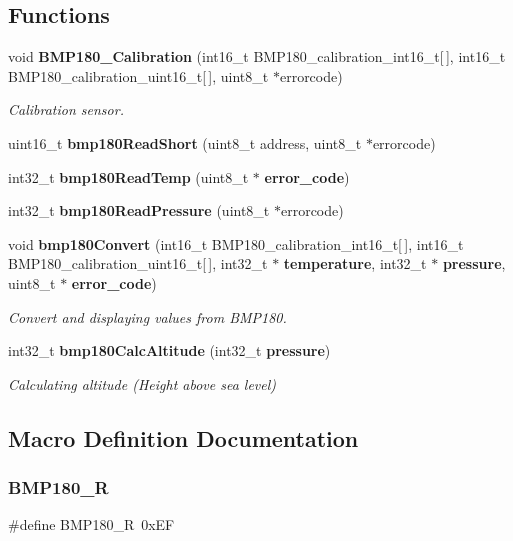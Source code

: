 \subsection*{Functions}
\begin{DoxyCompactItemize}
\item 
void \textbf{ B\+M\+P180\+\_\+\+Calibration} (int16\+\_\+t B\+M\+P180\+\_\+calibration\+\_\+int16\+\_\+t[$\,$], int16\+\_\+t B\+M\+P180\+\_\+calibration\+\_\+uint16\+\_\+t[$\,$], uint8\+\_\+t $\ast$errorcode)
\begin{DoxyCompactList}\small\item\em Calibration sensor. \end{DoxyCompactList}\item 
uint16\+\_\+t \textbf{ bmp180\+Read\+Short} (uint8\+\_\+t address, uint8\+\_\+t $\ast$errorcode)
\item 
int32\+\_\+t \textbf{ bmp180\+Read\+Temp} (uint8\+\_\+t $\ast$\textbf{ error\+\_\+code})
\item 
int32\+\_\+t \textbf{ bmp180\+Read\+Pressure} (uint8\+\_\+t $\ast$errorcode)
\item 
void \textbf{ bmp180\+Convert} (int16\+\_\+t B\+M\+P180\+\_\+calibration\+\_\+int16\+\_\+t[$\,$], int16\+\_\+t B\+M\+P180\+\_\+calibration\+\_\+uint16\+\_\+t[$\,$], int32\+\_\+t $\ast$\textbf{ temperature}, int32\+\_\+t $\ast$\textbf{ pressure}, uint8\+\_\+t $\ast$\textbf{ error\+\_\+code})
\begin{DoxyCompactList}\small\item\em Convert and displaying values from B\+M\+P180. \end{DoxyCompactList}\item 
int32\+\_\+t \textbf{ bmp180\+Calc\+Altitude} (int32\+\_\+t \textbf{ pressure})
\begin{DoxyCompactList}\small\item\em Calculating altitude (Height above sea level) \end{DoxyCompactList}\end{DoxyCompactItemize}


\subsection{Macro Definition Documentation}
\mbox{\label{bmp180__lib_8h_abe0923d608536d2c003fa3025a9deafb}} 
\subsubsection{B\+M\+P180\+\_\+R}
{\footnotesize\ttfamily \#define B\+M\+P180\+\_\+R~0x\+EF}




